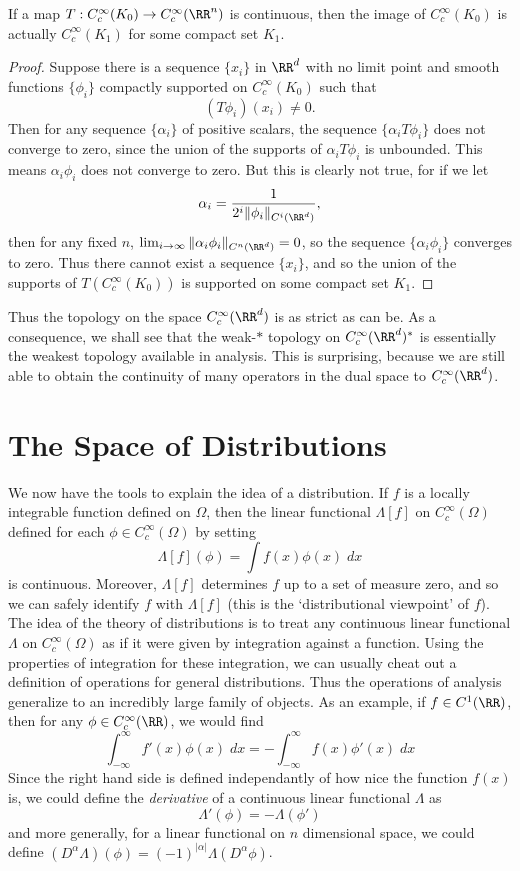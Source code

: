 \begin{theorem}
    If a map $T: C_c^\infty(K_0) \to C_c^\infty(\RR^n)$ is continuous, then the image of $C_c^\infty(K_0)$ is actually $C_c^\infty(K_1)$ for some compact set $K_1$.
\end{theorem}
\begin{proof}
    Suppose there is a sequence $\{ x_i \}$ in $\RR^d$ with no limit point and smooth functions $\{ \phi_i \}$ compactly supported on $C_c^\infty(K_0)$ such that
    \[ (T\phi_i)(x_i) \neq 0. \]
    Then for any sequence $\{ \alpha_i \}$ of positive scalars, the sequence $\{ \alpha_i T\phi_i \}$ does not converge to zero, since the union of the supports of $\alpha_i T\phi_i$ is unbounded. This means $\alpha_i \phi_i$ does not converge to zero. But this is clearly not true, for if we let
    \[ \alpha_i = \frac{1}{2^i \| \phi_i \|_{C^i(\RR^d)}}, \]
    then for any fixed $n$, $\lim_{i \to \infty} \| \alpha_i \phi_i \|_{C^n(\RR^d)} = 0$, so the sequence $\{ \alpha_i \phi_i \}$ converges to zero. Thus there cannot exist a sequence $\{ x_i \}$, and so the union of the supports of $T(C_c^\infty(K_0))$ is supported on some compact set $K_1$.
\end{proof}

Thus the topology on the space $C_c^\infty(\RR^d)$ is as strict as can be. As a consequence, we shall see that the weak-$*$ topology on $C_c^\infty(\RR^d)^*$ is essentially the weakest topology available in analysis. This is surprising, because we are still able to obtain the continuity of many operators in the dual space to $C_c^\infty(\RR^d)$.

\section{The Space of Distributions}

We now have the tools to explain the idea of a distribution. If $f$ is a locally integrable function defined on $\Omega$, then the linear functional $\Lambda[f]$ on $C_c^\infty(\Omega)$ defined for each $\phi \in C_c^\infty(\Omega)$ by setting
%
\[ \Lambda[f](\phi) = \int f(x) \phi(x)\; dx \]
%
is continuous. Moreover, $\Lambda[f]$ determines $f$ up to a set of measure zero, and so we can safely identify $f$ with $\Lambda[f]$ (this is the `distributional viewpoint' of $f$). The idea of the theory of distributions is to treat any continuous linear functional $\Lambda$ on $C_c^\infty(\Omega)$ as if it were given by integration against a function. Using the properties of integration for these integration, we can usually cheat out a definition of operations for general distributions. Thus the operations of analysis generalize to an incredibly large family of objects. As an example, if $f \in C^1(\RR)$, then for any $\phi \in C_c^\infty(\RR)$, we would find
%
\[ \int_{-\infty}^\infty f'(x) \phi(x)\; dx = - \int_{-\infty}^\infty f(x) \phi'(x)\; dx \]
%
Since the right hand side is defined independantly of how nice the function $f(x)$ is, we could define the {\it derivative} of a continuous linear functional $\Lambda$ as
%
\[ \Lambda'(\phi) = - \Lambda(\phi') \]
%
and more generally, for a linear functional on $n$ dimensional space, we could define $(D^\alpha \Lambda)(\phi) = (-1)^{|\alpha|} \Lambda(D^\alpha \phi)$.

